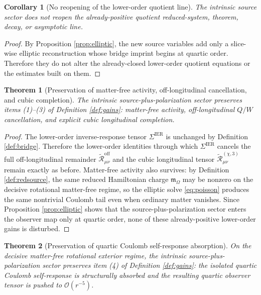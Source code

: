\documentclass[11pt]{article}
\newcommand{\HamChargeOmega}{\mathfrak m_\Omega}
\newcommand{\SigmaIER}{\Sigma^{\mathrm{IER}}}
\newcommand{\ReOff}{\widetilde{\mathcal R}_{\mu\nu}^{\mathrm{off}}}
\newcommand{\ReLongThree}{\widetilde{\mathcal R}_{\mu\nu}^{(\chi,3)}}
\newtheorem{corollary}{Corollary}
\newtheorem{theorem}{Theorem}
\begin{document}
\begin{corollary}[No reopening of the lower-order quotient line]
\label{cor:nopde}
The intrinsic source sector does not reopen the already-positive quotient reduced-system, theorem, decay, or asymptotic line.
\end{corollary}

\begin{proof}
By Proposition \ref{prop:elliptic}, the new source variables add only a slice-wise elliptic reconstruction whose bridge imprint begins at quartic order. Therefore they do not alter the already-closed lower-order quotient equations or the estimates built on them.
\end{proof}

\begin{theorem}[Preservation of matter-free activity, off-longitudinal cancellation, and cubic completion]
\label{thm:firstthree}
The intrinsic source-plus-polarization sector preserves items (1)--(3) of Definition \ref{def:gains}: matter-free activity, off-longitudinal \(Q/W\) cancellation, and explicit cubic longitudinal completion.
\end{theorem}

\begin{proof}
The lower-order inverse-response tensor \(\SigmaIER\) is unchanged by Definition \ref{def:bridge}. Therefore the lower-order identities through which \(\SigmaIER\) cancels the full off-longitudinal remainder \(\ReOff\) and the cubic longitudinal tensor \(\ReLongThree\) remain exactly as before. Matter-free activity also survives: by Definition \ref{def:redsource}, the same reduced Hamiltonian charge \(\HamChargeOmega\) may be nonzero on the decisive rotational matter-free regime, so the elliptic solve \eqref{eq:poisson} produces the same nontrivial Coulomb tail even when ordinary matter vanishes. Since Proposition \ref{prop:elliptic} shows that the source-plus-polarization sector enters the observer map only at quartic order, none of these already-positive lower-order gains is disturbed.
\end{proof}

\begin{theorem}[Preservation of quartic Coulomb self-response absorption]
\label{thm:quartic}
On the decisive matter-free rotational exterior regime, the intrinsic source-plus-polarization sector preserves item (4) of Definition \ref{def:gains}: the isolated quartic Coulomb self-response is structurally absorbed and the resulting quartic observer tensor is pushed to \(\mathcal O(r^{-5})\).
\end{theorem}
\end{document}
